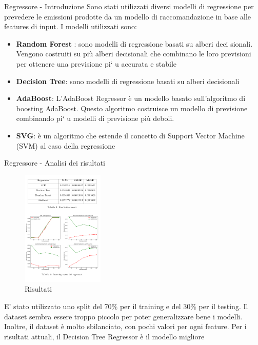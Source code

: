 \begin{frame}{Regressore - Introduzione}
Sono stati utilizzati diversi modelli di regressione per prevedere le emissioni prodotte da un modello di raccomandazione in base alle features di input. I modelli utilizzati sono:
\begin{itemize}
    \item \textbf{Random Forest} : sono modelli di regressione basati su alberi deci
    sionali. Vengono costruiti su più alberi decisionali che combinano le loro previsioni per ottenere una previsione
     pi` u accurata e stabile
    \item \textbf{Decision Tree}: sono modelli di regressione basati su alberi decisionali
    \item \textbf{AdaBoost}:  L’AdaBoost Regressor è un modello basato sull’algoritmo di boosting AdaBoost.
    Questo algoritmo costruisce un modello di previsione combinando pi` u modelli di previsione più deboli.
    \item \textbf{SVG}: è un algoritmo che estende il concetto di Support Vector Machine (SVM) al caso della regressione
\end{itemize}
\end{frame}
    


\begin{frame}{Regressore - Analisi dei risultati}
    \begin{figure}
    \centering
    \includegraphics[width=0.35\textwidth]{images/RegressorePrecedente.png}
    \caption{Risultati}
\end{figure}

E' stato utilizzato uno split del 70\% per il training e del 30\% per il testing.
Il dataset sembra essere troppo piccolo per poter generalizzare bene i modelli. Inoltre, il dataset è molto sbilanciato, con pochi valori per ogni feature. Per i risultati attuali, il Decision Tree Regressor è il modello migliore
\end{frame}